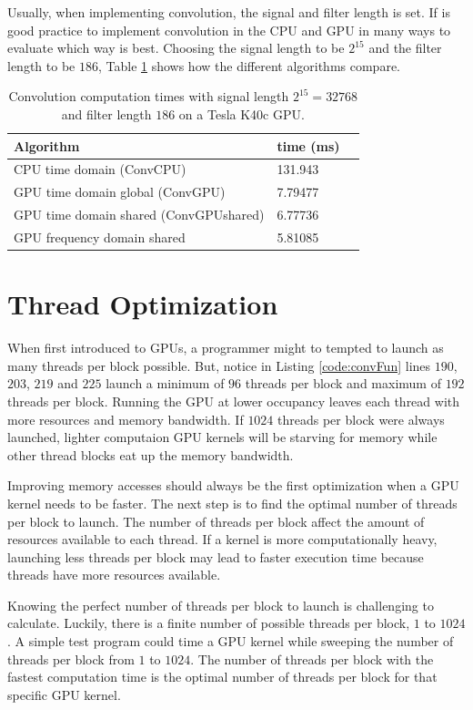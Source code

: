 Usually, when implementing convolution, the signal and filter length is set.
If is good practice to implement convolution in the CPU and GPU in many ways to evaluate which way is best.
Choosing the signal length to be $2^{15}$ and the filter length to be $186$, Table \ref{tab:CPUvsGPUtable} shows how the different algorithms compare.
\begin{table}
\begin{center}
\begin{tabular}{lll}
	\toprule
	Algorithm 								& time (ms) \\ \midrule
	CPU time domain (ConvCPU) 				& 131.943 	\\
	GPU time domain global (ConvGPU) 		& 7.79477	\\
	GPU time domain shared (ConvGPUshared) 	& 6.77736	\\
	GPU frequency domain shared 			& 5.81085	\\ 
	\bottomrule
\end{tabular}
\end{center}
\caption{Convolution computation times with signal length $2^{15} = 32768$ and filter length $186$ on a Tesla K40c GPU.}
\label{tab:CPUvsGPUtable}
\end{table}




\section{Thread Optimization}
When first introduced to GPUs, a programmer might to tempted to launch as many threads per block possible.
But, notice in Listing \ref{code:convFun} lines $190$, $203$, $219$ and $225$ launch a minimum of $96$ threads per block and maximum of $192$ threads per block.
Running the GPU at lower occupancy leaves each thread with more resources and memory bandwidth.
If $1024$ threads per block were always launched, lighter computaion GPU kernels will be starving for memory while other thread blocks eat up the memory bandwidth.

Improving memory accesses should always be the first optimization when a GPU kernel needs to be faster.
The next step is to find the optimal number of threads per block to launch.
The number of threads per block affect the amount of resources available to each thread.
If a kernel is more computationally heavy, launching less threads per block may lead to faster execution time because threads have more resources available. 

Knowing the perfect number of threads per block to launch is challenging to calculate.
Luckily, there is a finite number of possible threads per block, $1$ to $1024$.
A simple test program could time a GPU kernel while sweeping the number of threads per block from $1$ to $1024$.
The number of threads per block with the fastest computation time is the optimal number of threads per block for that specific GPU kernel.

